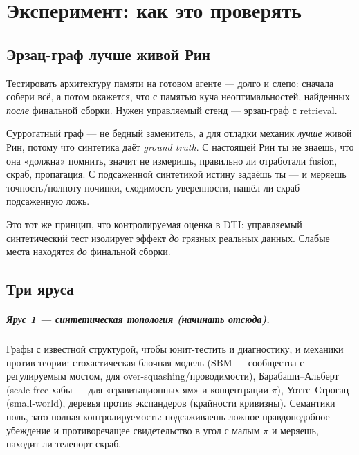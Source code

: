 \chapter{Эксперимент: как это проверять}
\label{ch:experiment}

\section{Эрзац-граф лучше живой Рин}
\label{sec:groundtruth}

Тестировать архитектуру памяти на готовом агенте — долго и слепо: сначала собери всё,
а потом окажется, что с памятью куча неоптимальностей, найденных \emph{после} финальной
сборки. Нужен управляемый стенд — эрзац-граф с retrieval.

\begin{principle}
Суррогатный граф — не бедный заменитель, а для отладки механик \emph{лучше} живой Рин,
потому что синтетика даёт \emph{ground truth}. С настоящей Рин ты не знаешь, что она
«должна» помнить, значит не измеришь, правильно ли отработали fusion, скраб, пропагация.
С подсаженной синтетикой истину задаёшь ты — и меряешь точность/полноту починки,
сходимость уверенности, нашёл ли скраб подсаженную ложь.
\end{principle}

Это тот же принцип, что контролируемая оценка в DTI: управляемый синтетический тест
изолирует эффект \emph{до} грязных реальных данных. Слабые места находятся \emph{до}
финальной сборки.

\section{Три яруса}

\paragraph{Ярус 1 — синтетическая топология (начинать отсюда).} Графы с известной
структурой, чтобы юнит-тестить и диагностику, и механики против теории: стохастическая
блочная модель (SBM — сообщества с регулируемым мостом, для over-squashing/проводимости),
Барабаши–Альберт (scale-free хабы — для «гравитационных ям» и концентрации $\pi$),
Уоттс–Строгац (small-world), деревья против экспандеров (крайности кривизны). Семантики
ноль, зато полная контролируемость: подсаживаешь ложное-правдоподобное убеждение и
противоречащее свидетельство в угол с малым $\pi$ и меряешь, находит ли телепорт-скраб.


